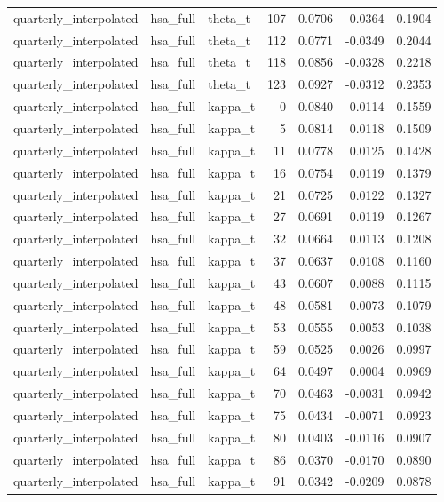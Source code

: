 \begin{tabular}{lllrrrr}
quarterly\_interpolated & hsa\_full & theta\_t & 107 & 0.0706 & -0.0364 & 0.1904 \\
quarterly\_interpolated & hsa\_full & theta\_t & 112 & 0.0771 & -0.0349 & 0.2044 \\
quarterly\_interpolated & hsa\_full & theta\_t & 118 & 0.0856 & -0.0328 & 0.2218 \\
quarterly\_interpolated & hsa\_full & theta\_t & 123 & 0.0927 & -0.0312 & 0.2353 \\
quarterly\_interpolated & hsa\_full & kappa\_t & 0 & 0.0840 & 0.0114 & 0.1559 \\
quarterly\_interpolated & hsa\_full & kappa\_t & 5 & 0.0814 & 0.0118 & 0.1509 \\
quarterly\_interpolated & hsa\_full & kappa\_t & 11 & 0.0778 & 0.0125 & 0.1428 \\
quarterly\_interpolated & hsa\_full & kappa\_t & 16 & 0.0754 & 0.0119 & 0.1379 \\
quarterly\_interpolated & hsa\_full & kappa\_t & 21 & 0.0725 & 0.0122 & 0.1327 \\
quarterly\_interpolated & hsa\_full & kappa\_t & 27 & 0.0691 & 0.0119 & 0.1267 \\
quarterly\_interpolated & hsa\_full & kappa\_t & 32 & 0.0664 & 0.0113 & 0.1208 \\
quarterly\_interpolated & hsa\_full & kappa\_t & 37 & 0.0637 & 0.0108 & 0.1160 \\
quarterly\_interpolated & hsa\_full & kappa\_t & 43 & 0.0607 & 0.0088 & 0.1115 \\
quarterly\_interpolated & hsa\_full & kappa\_t & 48 & 0.0581 & 0.0073 & 0.1079 \\
quarterly\_interpolated & hsa\_full & kappa\_t & 53 & 0.0555 & 0.0053 & 0.1038 \\
quarterly\_interpolated & hsa\_full & kappa\_t & 59 & 0.0525 & 0.0026 & 0.0997 \\
quarterly\_interpolated & hsa\_full & kappa\_t & 64 & 0.0497 & 0.0004 & 0.0969 \\
quarterly\_interpolated & hsa\_full & kappa\_t & 70 & 0.0463 & -0.0031 & 0.0942 \\
quarterly\_interpolated & hsa\_full & kappa\_t & 75 & 0.0434 & -0.0071 & 0.0923 \\
quarterly\_interpolated & hsa\_full & kappa\_t & 80 & 0.0403 & -0.0116 & 0.0907 \\
quarterly\_interpolated & hsa\_full & kappa\_t & 86 & 0.0370 & -0.0170 & 0.0890 \\
quarterly\_interpolated & hsa\_full & kappa\_t & 91 & 0.0342 & -0.0209 & 0.0878 \\

\end{tabular}
